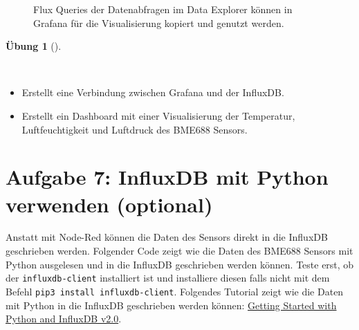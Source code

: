 \documentclass[
  11pt,
  a4paperpaper,
  oneside, openany  ,captions=tableheading
]{scrbook}
\providecommand{\tightlist}{%
  \setlength{\itemsep}{0pt}\setlength{\parskip}{0pt}}
\theoremstyle{definition}
\newtheorem{exercise}{Übung}[chapter]
\theoremstyle{remark}
\begin{document}
\begin{figure}


\caption{\label{fig-grafanainfluxdbquery}Flux Queries der Datenabfragen
im Data Explorer können in Grafana für die Visualisierung kopiert und
genutzt werden.}

\end{figure}%

\begin{exercise}[]\protect\hypertarget{exr-influxb-grafana}{}\label{exr-influxb-grafana}

~

\begin{itemize}
\tightlist
\item
  Erstellt eine Verbindung zwischen Grafana und der InfluxDB.
\item
  Erstellt ein Dashboard mit einer Visualisierung der Temperatur,
  Luftfeuchtigkeit und Luftdruck des BME688 Sensors.
\end{itemize}

\end{exercise}

\section{Aufgabe 7: InfluxDB mit Python verwenden
(optional)}\label{aufgabe-7-influxdb-mit-python-verwenden-optional}

Anstatt mit Node-Red können die Daten des Sensors direkt in die InfluxDB
geschrieben werden. Folgender Code zeigt wie die Daten des BME688
Sensors mit Python ausgelesen und in die InfluxDB geschrieben werden
können. Teste erst, ob der \texttt{influxdb-client} installiert ist und
installiere diesen falls nicht mit dem Befehl
\texttt{pip3\ install\ influxdb-client}. Folgendes Tutorial zeigt wie
die Daten mit Python in die InfluxDB geschrieben werden können:
\href{https://www.influxdata.com/blog/getting-started-with-python-and-influxdb-v2-0/}{Getting
Started with Python and InfluxDB v2.0}.
\end{document}
